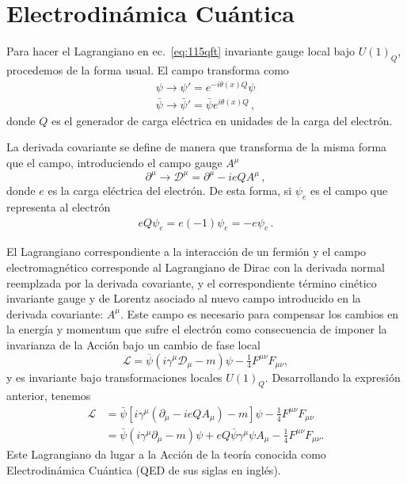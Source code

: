 \section{Electrodinámica Cuántica}
\label{sec:electr-cuant}

Para hacer el Lagrangiano en ec.~\eqref{eq:115qft} invariante gauge local bajo $U(1)_Q$, procedemos de la forma usual. El campo transforma como
\begin{align}
  \psi\to\psi'=e^{-i\theta(x)Q}\psi\nonumber\\
  \bar{\psi}\to\bar{\psi}'=\bar{\psi}e^{i\theta(x)Q}\,,
\end{align}
donde $Q$ es el generador de carga eléctrica en unidades de la carga del electrón.

La derivada covariante se define de manera que transforma de la misma forma que el campo, introduciendo el campo gauge $A^\mu$
\begin{equation}
  \label{eq:202qft}
  \partial^\mu\to\mathcal{D}^\mu=\partial^\mu-ieQA^\mu\,,
\end{equation}
donde $e$ es la carga eléctrica del electrón. De esta forma, si $\psi_e$ es el campo que representa al electrón
\begin{align}
  eQ \psi_e=e(-1)\psi_e=-e \psi_e\,.
\end{align}

El Lagrangiano correspondiente a la interacción de un fermión y el campo electromagnético corresponde al Lagrangiano de Dirac con la derivada normal reemplzada por la derivada covariante, y el correspondiente término cinético invariante gauge y de Lorentz asociado al nuevo campo introducido en la derivada covariante: $A^\mu$. Este campo es necesario para compensar los cambios en la energía y momentum que sufre el electrón como consecuencia de imponer la invarianza de la Acción bajo un cambio de fase local 
\begin{equation}
  \label{eq:201qft}
  \mathcal{L}=\overline{\psi}\left(i\gamma^\mu\mathcal{D}_\mu-m\right)\psi -\tfrac{1}{4}F^{\mu\nu}F_{\mu\nu},
\end{equation}
y es invariante bajo transformaciones locales $U(1)_Q$. Desarrollando la expresión anterior, tenemos
\begin{align}
    \mathcal{L}&=\bar{\psi}\left[i\gamma^\mu\left(\partial_\mu-ieQA_\mu\right)-m\right]\psi -\tfrac{1}{4}F^{\mu\nu}F_{\mu\nu}\nonumber\\
    &=\bar{\psi}\left(i\gamma^\mu\partial_\mu-m\right)\psi+eQ\bar{\psi}\gamma^\mu\psi A_\mu -\tfrac{1}{4}F^{\mu\nu}F_{\mu\nu}.
\end{align}
Este Lagrangiano da lugar a la Acción de la teoría conocida como Electrodinámica Cuántica (QED de sus siglas en inglés).

